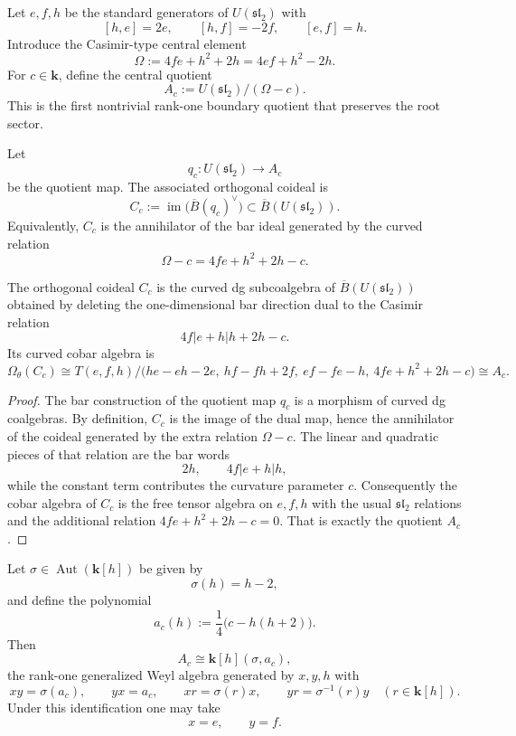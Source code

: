 Let $e,f,h$ be the standard generators of $U(\mathfrak{sl}_2)$ with
\[
[h,e]=2e,
\qquad
[h,f]=-2f,
\qquad
[e,f]=h.
\]
Introduce the Casimir-type central element
\[
\Omega:=4fe+h^2+2h=4ef+h^2-2h.
\]
For $c\in\mathbf{k}$, define the central quotient
\[
A_c:=U(\mathfrak{sl}_2)/(\Omega-c).
\]
This is the first nontrivial rank-one boundary quotient that preserves the root
sector.

\begin{definition}
\label{def:rank-one-orthogonal-coideal}
Let
\[
q_c\colon U(\mathfrak{sl}_2)\to A_c
\]
be the quotient map.  The associated orthogonal coideal is
\[
C_c:=\operatorname{im}\bigl(\overline{B}(q_c)^\vee\bigr)
\subset \overline{B}(U(\mathfrak{sl}_2)).
\]
Equivalently, $C_c$ is the annihilator of the bar ideal generated by the curved
relation
\[
\Omega-c=4fe+h^2+2h-c.
\]
\end{definition}

\begin{theorem}
\label{thm:explicit-rank-one-orthogonal-coideal}
The orthogonal coideal $C_c$ is the curved dg subcoalgebra of
$\overline{B}(U(\mathfrak{sl}_2))$ obtained by deleting the one-dimensional bar
direction dual to the Casimir relation
\[
4f|e+h|h+2h-c.
\]
Its curved cobar algebra is
\[
\Omega_\theta(C_c)
\cong
T(e,f,h)\Big/\bigl(he-eh-2e,\ hf-fh+2f,\ ef-fe-h,\ 4fe+h^2+2h-c\bigr)
\cong A_c.
\]
\end{theorem}

\begin{proof}
The bar construction of the quotient map $q_c$ is a morphism of curved dg
coalgebras.  By definition, $C_c$ is the image of the dual map, hence the
annihilator of the coideal generated by the extra relation $\Omega-c$.  The
linear and quadratic pieces of that relation are the bar words
\[
2h,
\qquad
4f|e+h|h,
\]
while the constant term contributes the curvature parameter $c$.
Consequently the cobar algebra of $C_c$ is the free tensor algebra on $e,f,h$
with the usual $\mathfrak{sl}_2$ relations and the additional relation
$4fe+h^2+2h-c=0$.  That is exactly the quotient $A_c$.
\end{proof}

\begin{corollary}
\label{cor:generalized-weyl-normal-form}
Let $\sigma\in \operatorname{Aut}(\mathbf{k}[h])$ be given by
\[
\sigma(h)=h-2,
\]
and define the polynomial
\[
a_c(h):=\frac{1}{4}\bigl(c-h(h+2)\bigr).
\]
Then
\[
A_c\cong \mathbf{k}[h](\sigma,a_c),
\]
the rank-one generalized Weyl algebra generated by $x,y,h$ with
\[
xy=\sigma(a_c),
\qquad yx=a_c,
\qquad xr=\sigma(r)x,
\qquad yr=\sigma^{-1}(r)y
\quad (r\in\mathbf{k}[h]).
\]
Under this identification one may take
\[
x=e,
\qquad y=f.
\]
\end{corollary}


